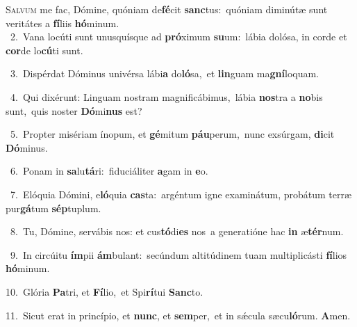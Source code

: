 \lettrine{\initial\textcolor{\initialcolor}{S}}{alvum} me fac, Dómine, quóniam de\-\textbf{fé}\-cit \textbf{sanc}\-tus:~\star quóniam diminútæ sunt veritátes a \textbf{fí}\-liis \textbf{hó}\-minum.\\
{\numbfont\textcolor{\numbcolor}{~2.}}~Vana locúti sunt unusquísque ad \textbf{pró}\-ximum \textbf{su}\-um:~\star lábia dolósa, in corde et \textbf{cor}\-de lo\-\textbf{cú}\-ti sunt.\par
{\numbfont\textcolor{\numbcolor}{~3.}}~Dispérdat Dóminus univérsa lábi\textbf{a} do\-\textbf{ló}\-sa,~\star et \textbf{lin}\-guam ma\-\textbf{gní}\-loquam.\par
{\numbfont\textcolor{\numbcolor}{~4.}}~Qui dixérunt: Linguam nostram magnificábimus,~\dagger lábia \textbf{nos}\-tra a \textbf{no}\-bis sunt,~\star quis noster \textbf{Dó}\-mi\textbf{nus} est?\par
{\numbfont\textcolor{\numbcolor}{~5.}}~Propter misériam ínopum, et \textbf{gé}\-mitum \textbf{páu}\-perum,~\star nunc exsúrgam, \textbf{di}\-cit \textbf{Dó}\-minus.\par
{\numbfont\textcolor{\numbcolor}{~6.}}~Ponam in \textbf{sa}\-lu\-\textbf{tá}\-ri:~\star fiduciáliter \textbf{a}\-gam in \textbf{e}\-o.\par
{\numbfont\textcolor{\numbcolor}{~7.}}~Elóquia Dómini, e\-\textbf{ló}\-quia \textbf{cas}\-ta:~\star argéntum igne examinátum, probátum terræ pur\-\textbf{gá}\-tum \textbf{sép}\-tuplum.\par
{\numbfont\textcolor{\numbcolor}{~8.}}~Tu, Dómine, servábis nos: et cus\-\textbf{tó}\-di\textbf{es} nos~\star a generatióne hac \textbf{in} æ\-\textbf{tér}\-num.\par
{\numbfont\textcolor{\numbcolor}{~9.}}~In circúitu \textbf{ím}\-pii \textbf{ám}\-bulant:~\star secúndum altitúdinem tuam multiplicásti \textbf{fí}\-lios \textbf{hó}\-minum.\par
{\numbfont\textcolor{\numbcolor}{10.}}~Glória \textbf{Pa}\-tri, et \textbf{Fí}\-lio,~\star et Spi\-\textbf{rí}\-tui \textbf{Sanc}\-to.\par
{\numbfont\textcolor{\numbcolor}{11.}}~Sicut erat in princípio, et \textbf{nunc}\-, et \textbf{sem}\-per,~\star et in sǽcula sæcu\-\textbf{ló}\-rum. \textbf{A}\-men.\par
